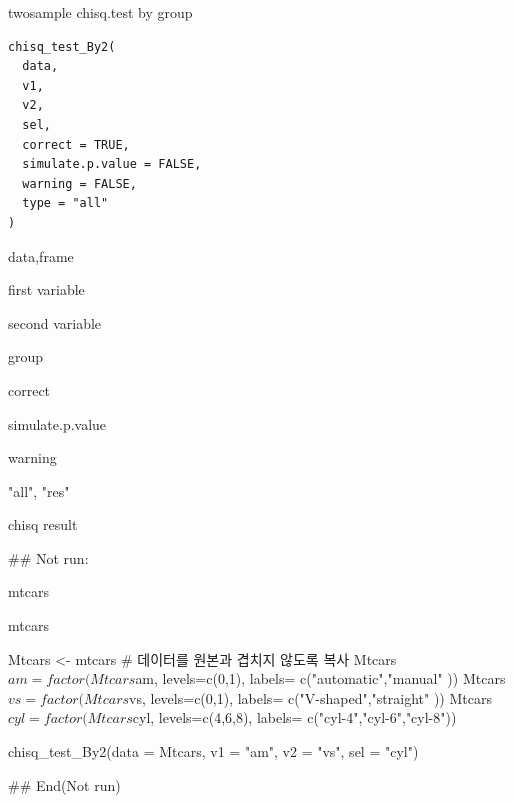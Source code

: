\documentclass[a4paper]{book}
\begin{document}
%
\begin{Description}
twosample chisq.test by group
\end{Description}
%
\begin{Usage}
\begin{verbatim}
chisq_test_By2(
  data,
  v1,
  v2,
  sel,
  correct = TRUE,
  simulate.p.value = FALSE,
  warning = FALSE,
  type = "all"
)
\end{verbatim}
\end{Usage}
%
\begin{Arguments}
\begin{ldescription}
\item[\code{data}] data,frame

\item[\code{v1}] first variable

\item[\code{v2}] second variable

\item[\code{sel}] group

\item[\code{correct}] correct

\item[\code{simulate.p.value}] simulate.p.value

\item[\code{warning}] warning

\item[\code{type}] "all", "res"
\end{ldescription}
\end{Arguments}
%
\begin{Value}
chisq result
\end{Value}
%
\begin{Examples}
\begin{ExampleCode}
\#\# Not run: 

mtcars%

mtcars%

Mtcars <- mtcars  # 데이터를 원본과 겹치지 않도록 복사
Mtcars$am = factor(Mtcars$am, levels=c(0,1), labels= c("automatic","manual" ))
Mtcars$vs = factor(Mtcars$vs, levels=c(0,1), labels= c("V-shaped","straight" ))
Mtcars$cyl = factor(Mtcars$cyl, levels=c(4,6,8),
             labels= c("cyl-4","cyl-6","cyl-8"))

chisq_test_By2(data = Mtcars, v1 = "am", v2 = "vs", sel = "cyl")


## End(Not run)




\end{ExampleCode}
\end{Examples}
\end{document}
